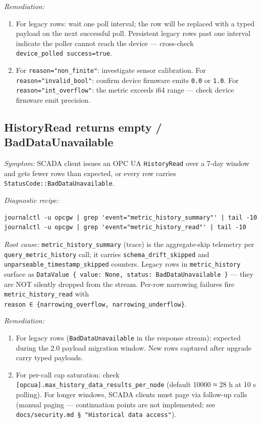 \emph{Remediation:}

\begin{enumerate}
\def\labelenumi{\arabic{enumi}.}
\item
  For legacy rows: wait one poll interval; the row will be replaced with a typed payload on the next successful poll. Persistent legacy rows past one interval indicate the poller cannot reach the device --- cross-check \texttt{device\_polled\ success=true}.
\item
  For \texttt{reason="non\_finite"}: investigate sensor calibration. For \texttt{reason="invalid\_bool"}: confirm device firmware emits \texttt{0.0} or \texttt{1.0}. For \texttt{reason="int\_overflow"}: the metric exceeds i64 range --- check device firmware emit precision.
\end{enumerate}

\subsection{HistoryRead returns empty / BadDataUnavailable}\label{sec-issue-historyread-empty}

\emph{Symptom:} SCADA client issues an OPC UA \texttt{HistoryRead} over a 7-day window and gets fewer rows than expected, or every row carries \texttt{StatusCode::BadDataUnavailable}.

\emph{Diagnostic recipe:}

\begin{lstlisting}
journalctl -u opcgw | grep 'event="metric_history_summary"' | tail -10
journalctl -u opcgw | grep 'event="metric_history_read"' | tail -10
\end{lstlisting}

\emph{Root cause:} \texttt{metric\_history\_summary} (trace) is the aggregate-skip telemetry per \texttt{query\_metric\_history} call; it carries \texttt{schema\_drift\_skipped} and \texttt{unparseable\_timestamp\_skipped} counters. Legacy rows in \texttt{metric\_history} surface as \texttt{DataValue\ \{\ value:\ None,\ status:\ BadDataUnavailable\ \}} --- they are NOT silently dropped from the stream. Per-row narrowing failures fire \texttt{metric\_history\_read} with \texttt{reason\ ∈\ \{narrowing\_overflow,\ narrowing\_underflow\}}.

\emph{Remediation:}

\begin{enumerate}
\def\labelenumi{\arabic{enumi}.}
\item
  For legacy rows (\texttt{BadDataUnavailable} in the response stream): expected during the 2.0 payload migration window. New rows captured after upgrade carry typed payloads.
\item
  For per-call cap saturation: check \texttt{{[}opcua{]}.max\_history\_data\_results\_per\_node} (default 10000 ≈ 28 h at 10 s polling). For longer windows, SCADA clients must page via follow-up calls (manual paging --- continuation points are not implemented; see \texttt{docs/security.md\ §\ "Historical\ data\ access"}).
\end{enumerate}


